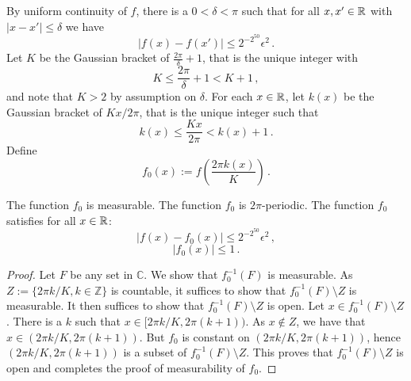 {By uniform  continuity of $f$, there is a $0<\delta<\pi$
such that for all $x,x' \in {\mathbb{R}}$ with $|x-x'|\le \delta$
we have
\begin{equation}\label{uniconbound}
|f(x)-f(x')|\le 2^{-2^{50}}\epsilon^2\, .
\end{equation}
Let $K$ be the Gaussian bracket of $\frac{2\pi}\delta+1$, that is the unique integer with
\begin{equation}
    K\le  \frac{2\pi}{\delta} +1< K+1\,,
\end{equation}
and note that $K>2$ by assumption on $\delta$.
For each $x\in {\mathbb{R}}$, let $k(x)$ be the Gaussian bracket of $Kx/2\pi$, that is the unique integer such that
\begin{equation}\label{definekx}
k(x)\le \frac{Kx}{2\pi}<k(x)+1\, .
\end{equation}
Define
\begin{equation}\label{def-fzero}
f_0(x):=f\left(\frac{2\pi k(x)}{K}\right)\, .
\end{equation}
\begin{lemma}
\label{piecewise-constant-
approximation}
The function $f_0$ is measurable.
The function $f_0$ is $2\pi$-periodic.
The function $f_0$ satisfies for all $x\in {\mathbb{R}}$:
\begin{equation}\label{eq-ffzero}
|f(x)-f_0(x)|\le  2^{-2^{50}} \epsilon^2\, ,
\end{equation}
\begin{equation}\label{eq-ffzero1}
|f_0(x)|\le  1\, .
\end{equation}
\end{lemma}

\begin{proof}
Let $F$ be any set in $\mathbb{C}$. We show that
$f_0^{-1}(F)$ is measurable. As
$Z:=\{2\pi k/K, k\in \mathbb{Z}\}$ is countable, it suffices to show
that $f_0^{-1}(F)\setminus Z$ is measurable. It then
suffices to show that $f_0^{-1}(F)\setminus Z$ is open.
Let $x\in f_0^{-1}(F)\setminus Z$. There is a $k$
such that $x\in [2\pi k/K, 2\pi (k+1))$. As $x\not\in Z$, we have that $x\in (2\pi k/K, 2\pi (k+1))$.
But $f_0$ is constant on $(2\pi k/K, 2\pi (k+1))$,
hence $(2\pi k/K, 2\pi (k+1))$ is a subset of
$f_0^{-1}(F)\setminus Z$. This proves that
$f_0^{-1}(F)\setminus Z$ is open and completes the proof of measurability of $f_0$.





\end{proof}}
